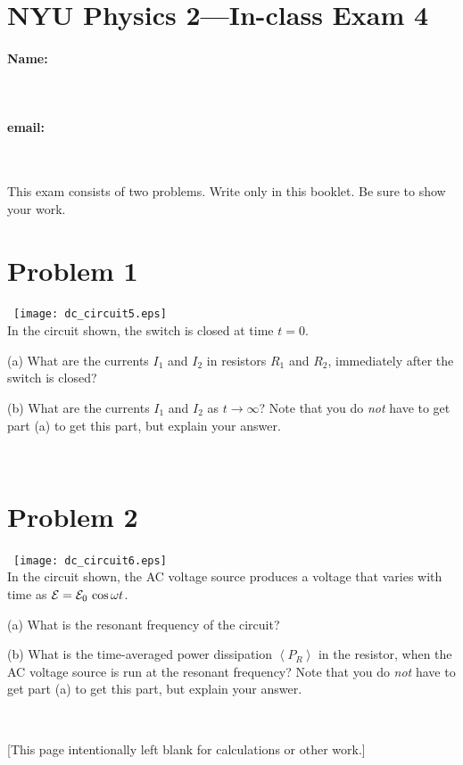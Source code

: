 \documentclass[12pt]{article}
\begin{document}
\section*{NYU Physics 2---In-class Exam 4}

\vfill

\paragraph{Name:} ~
\paragraph{email:} ~

\vfill
\noindent
\resizebox{\textwidth}{!}{}
\vfill

This exam consists of two problems.  Write only in this booklet.  Be
sure to show your work.

\clearpage

\section*{Problem 1}

\noindent
~\hfill\texttt{[image: dc\_circuit5.eps]}\hfill~\\
In the circuit shown, the switch is closed at time $t=0$.

(a) What are the currents $I_1$ and $I_2$ in resistors $R_1$ and
$R_2$, immediately after the switch is closed?

\vfill

(b) What are the currents $I_1$ and $I_2$ as $t\rightarrow\infty$?
Note that you do \emph{not} have to get part (a) to get this part, but
explain your answer.

\vfill ~
\clearpage

\section*{Problem 2}

\noindent
~\hfill\texttt{[image: dc\_circuit6.eps]}\hfill~\\
In the circuit shown, the AC voltage source produces a voltage that
varies with time as ${\cal E}= {\cal E}_0\,\cos\omega t$.

(a) What is the resonant frequency of the circuit?

\vfill

(b) What is the time-averaged power dissipation $\left<P_R\right>$ in
the resistor, when the AC voltage source is run at the resonant
frequency?  Note that you do \emph{not} have to get part (a) to get
this part, but explain your answer.

\vfill ~
\clearpage

[This page intentionally left blank for calculations or other work.]
\end{document}
